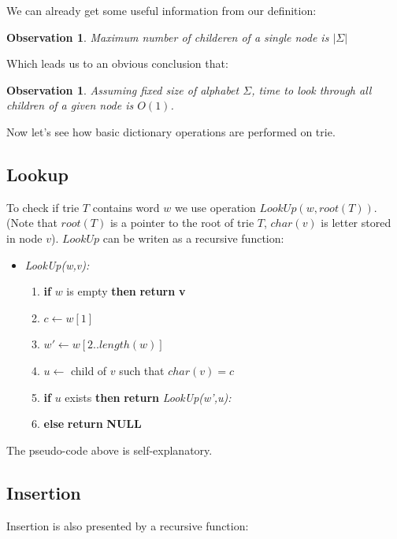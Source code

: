 \documentclass[a4paper,12pt]{article}
\newtheorem{obs}[defi]{Observation}
\begin{document}
We can already get some useful information from our definition:

\begin{obs}
Maximum number of childeren of a single node is $|\Sigma|$ 
\end{obs}

\noindent Which leads us to an obvious conclusion that:

\begin{obs}
Assuming fixed size of alphabet $\Sigma$, time to look through all children of a given node is $O(1)$.
\end{obs}

\noindent Now let's see how basic dictionary operations are performed on trie.

\subsection{Lookup}

To check if trie $T$ contains word $w$ we use operation $LookUp(w,root(T))$. (Note that $root(T)$ is a pointer to the root of trie $T$, $char(v)$ is letter stored in node $v$). $LookUp$ can be writen as a recursive function:


\begin{itemize}
\item {\em LookUp(w,v):}
	\begin{enumerate}
	\item {\bf if} $w$ is empty {\bf then} {\bf return} {\bf v} 
	\item $c  \gets w[1]$
	\item $w' \gets w[2..length(w)]$
	\item $u  \gets$ child of $v$ such that $char(v)=c$
	\item {\bf if} $u$ exists {\bf then} {\bf return} {\em LookUp(w',u):}
	\item {\bf else} {\bf return} {\bf NULL}
	\end{enumerate}
\end{itemize}

The pseudo-code above is self-explanatory. 

\subsection{Insertion}

Insertion is also presented by a recursive function: 
\end{document}
